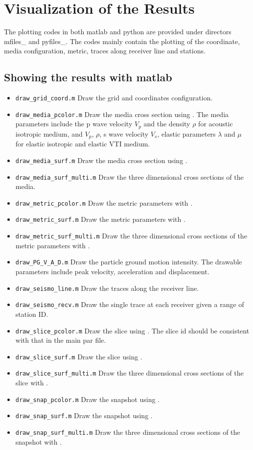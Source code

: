 \chapter{Visualization of the Results}\label{chapter-postproc}
The plotting codes in both matlab and python are provided under directors mfiles\_ and pyfiles\_. The codes mainly contain the plotting of the coordinate, media configuration, metric, traces along receiver line and stations. 
\section{Showing the results with matlab}
\begin{itemize}
\item \texttt{draw\_grid\_coord.m} Draw the grid and coordinates configuration.
\item \texttt{draw\_media\_pcolor.m} Draw the media cross section using . The media parameters include the p wave velocity $V_p$ and the density $\rho$ for acoustic isotropic medium, and $V_p$, $\rho$, s wave velocity $V_s$, elastic parameters $\lambda$ and $\mu$ for elastic isotropic and elastic VTI medium.
\item \texttt{draw\_media\_surf.m} Draw the media cross section using . 
\item \texttt{draw\_media\_surf\_multi.m} Draw the three dimensional cross sections of the media. 
\item \texttt{draw\_metric\_pcolor.m} Draw the metric parameters with . 
\item \texttt{draw\_metric\_surf.m} Draw the metric parameters with .
\item \texttt{draw\_metric\_surf\_multi.m} Draw the three dimensional cross sections of the metric parameters with .
\item \texttt{draw\_PG\_V\_A\_D.m} Draw the particle ground motion intensity. The drawable parameters include peak velocity, acceleration and displacement.
\item \texttt{draw\_seismo\_line.m} Draw the traces along the receiver line.
\item \texttt{draw\_seismo\_recv.m} Draw the single trace at each receiver given a range of station ID.
\item \texttt{draw\_slice\_pcolor.m} Draw the slice using . The slice id should be consistent with that in the main par file.
\item \texttt{draw\_slice\_surf.m} Draw the slice using .
\item \texttt{draw\_slice\_surf\_multi.m} Draw the three dimensional cross sections of the slice with .
\item \texttt{draw\_snap\_pcolor.m} Draw the snapshot using . 
\item \texttt{draw\_snap\_surf.m} Draw the snapshot using .
\item \texttt{draw\_snap\_surf\_multi.m} Draw the three dimensional cross sections of the snapshot with .
\end{itemize}
